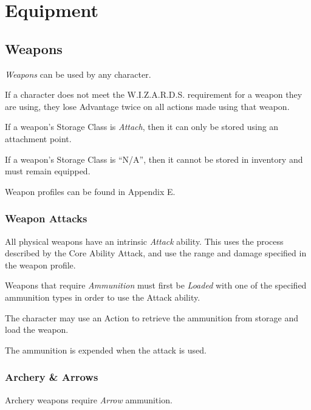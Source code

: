 
\chapter{Equipment}


\section{Weapons}
\textit{Weapons} can be used by any character.

\vspace{0.4em}

If a character does not meet the W.I.Z.A.R.D.S. requirement for a weapon they are using, 
they lose Advantage twice on all actions made using that weapon.

\vspace{0.4em}

If a weapon's Storage Class is \textit{Attach}, then it can only be stored using an attachment point.

\vspace{0.4em}

If a weapon's Storage Class is ``N/A'', then it cannot be stored in inventory and must remain equipped.

\vspace{0.4em}

Weapon profiles can be found in Appendix E.


\subsection{Weapon Attacks}
All physical weapons have an intrinsic \textit{Attack} ability.
This uses the process described by the Core Ability Attack, 
and use the range and damage specified in the weapon profile.

\vspace{0.4em}

Weapons that require \textit{Ammunition} must first be \textit{Loaded} with one of the 
specified ammunition types in order to use the Attack ability.

\vspace{0.4em}

The character may use an Action to retrieve the ammunition from storage and load the weapon.

The ammunition is expended when the attack is used.


\subsection{Archery \& Arrows}
Archery weapons require \textit{Arrow} ammunition. 

